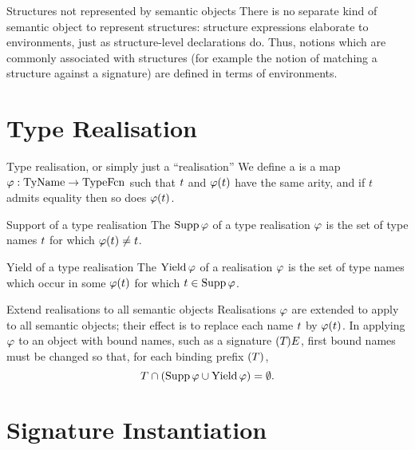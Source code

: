 \begin{clause}{Structures not represented by semantic objects}
There is no separate kind of semantic object to represent structures:
structure expressions elaborate to environments, just as structure-level
declarations do. Thus, notions which are commonly associated with
structures (for example the notion of matching a structure against a
signature) are defined in terms of environments.
\end{clause}

\section{Type Realisation}

\begin{definition}{Type realisation, or simply just a ``realisation''}
We define a  is a map
$\varphi:{\rm TyName}\to{\rm TypeFcn}$
such that
$t$ and $\varphi(t)$ have the same arity, and
if $t$ admits equality then so does $\varphi(t)$.
\end{definition}

\begin{definition}{Support of a type realisation}
The  $\mathop{\rm Supp}\nolimits\varphi$ of a type realisation $\varphi$ is the set of
type names $t$ for which $\varphi(t)\ne t$.
\end{definition}

\begin{definition}{Yield of a type realisation}
The  $\mathop{\rm Yield}\nolimits\varphi$ of a realisation $\varphi$ is the set of
type names which occur in some $\varphi(t)$ for which $t\in\mathop{\rm Supp}\nolimits\varphi$.
\end{definition}

\begin{clause}{Extend realisations to all semantic objects}
Realisations $\varphi$ are extended to apply to all semantic objects; their
effect is to
replace each name $t$ by $\varphi(t)$. In applying $\varphi$ to an object with
bound names, such as a signature $(T_{})E_{}$, first bound names must be
changed so that, for each binding prefix $(T)$,
\begin{equation*}
T\cap(\mathop{\rm Supp}\nolimits\varphi\cup\mathop{\rm Yield}\nolimits\varphi)=\emptyset.
\end{equation*}
\end{clause}

\section{Signature Instantiation}

